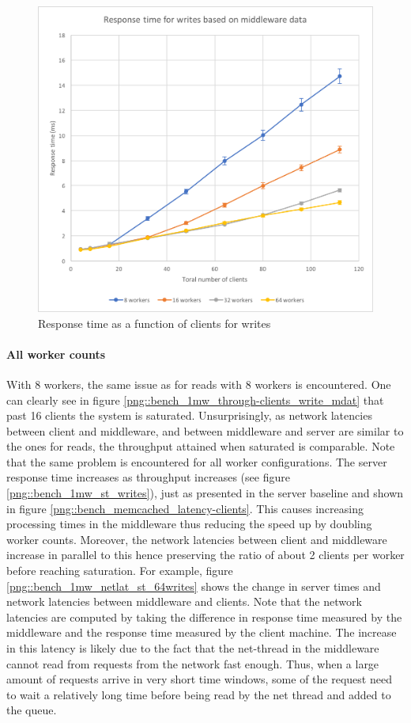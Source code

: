 \documentclass[11pt,a4paper]{article}
\begin{document}
\begin{figure}[!h]
\begin{minipage}[b]{.45\textwidth}
        \includegraphics[width=\textwidth]{processing/graphics/bench_1mw_latency-clients_write_mdat.png}
        \caption{Response time as a function of clients for writes}
        \label{png::bench_1mw_latency-clients_write_mdat}
    \end{minipage}
\end{figure}

\paragraph{All worker counts}
With 8 workers, the same issue as for reads with 8 workers is encountered. One can clearly see in figure \ref{png::bench_1mw_through-clients_write_mdat} that past 16 clients the system is saturated. Unsurprisingly, as network latencies between client and middleware, and between middleware and server are similar to the ones for reads, the throughput attained when saturated is comparable. Note that the same problem is encountered for all worker configurations. The server response time increases as throughput increases (see figure \ref{png::bench_1mw_st_writes}), just as presented in the server baseline and shown in figure \ref{png::bench_memcached_latency-clients}. This causes increasing processing times in the middleware thus reducing the speed up by doubling worker counts. Moreover, the network latencies between client and middleware increase in parallel to this hence preserving the ratio of about 2 clients per worker before reaching saturation. For example, figure \ref{png::bench_1mw_netlat_st_64writes} shows the change in server times and network latencies between middleware and clients. Note that the network latencies are computed by taking the difference in response time measured by the middleware and the response time measured by the client machine. The increase in this latency is likely due to the fact that the net-thread in the middleware cannot read from requests from the network fast enough. Thus, when a large amount of requests arrive in very short time windows, some of the request need to wait a relatively long time before being read by the net thread and added to the queue.
\end{document}
